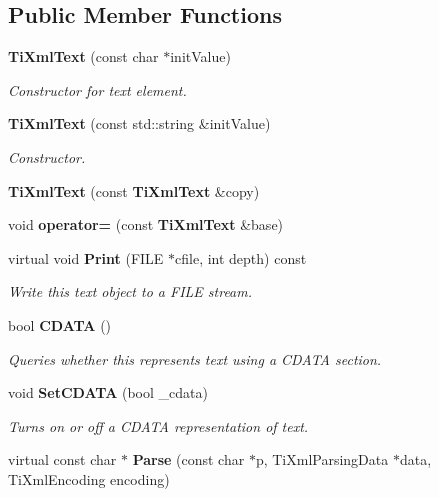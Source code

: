 \subsection*{Public Member Functions}
\begin{CompactItemize}
\item 
{\bf Ti\-Xml\-Text} (const char $\ast$init\-Value)
\begin{CompactList}\small\item\em Constructor for text element. \item\end{CompactList}\item 
{\bf Ti\-Xml\-Text} (const std::string \&init\-Value)\label{classTiXmlText_TiXmlTexta2}

\begin{CompactList}\small\item\em Constructor. \item\end{CompactList}\item 
{\bf Ti\-Xml\-Text} (const {\bf Ti\-Xml\-Text} \&copy)\label{classTiXmlText_TiXmlTexta3}

\item 
void {\bf operator=} (const {\bf Ti\-Xml\-Text} \&base)\label{classTiXmlText_TiXmlTexta4}

\item 
virtual void {\bf Print} (FILE $\ast$cfile, int depth) const\label{classTiXmlText_TiXmlTexta5}

\begin{CompactList}\small\item\em Write this text object to a FILE stream. \item\end{CompactList}\item 
bool {\bf CDATA} ()\label{classTiXmlText_TiXmlTexta6}

\begin{CompactList}\small\item\em Queries whether this represents text using a CDATA section. \item\end{CompactList}\item 
void {\bf Set\-CDATA} (bool \_\-cdata)\label{classTiXmlText_TiXmlTexta7}

\begin{CompactList}\small\item\em Turns on or off a CDATA representation of text. \item\end{CompactList}\item 
virtual const char $\ast$ {\bf Parse} (const char $\ast$p, Ti\-Xml\-Parsing\-Data $\ast$data, Ti\-Xml\-Encoding encoding)\label{classTiXmlText_TiXmlTexta8}


\end{CompactItemize}
